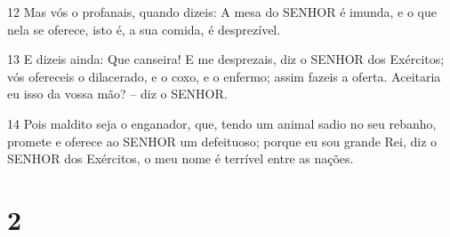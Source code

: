 \par 12 Mas vós o profanais, quando dizeis: A mesa do SENHOR é imunda, e o que nela se oferece, isto é, a sua comida, é desprezível.
\par 13 E dizeis ainda: Que canseira! E me desprezais, diz o SENHOR dos Exércitos; vós ofereceis o dilacerado, e o coxo, e o enfermo; assim fazeis a oferta. Aceitaria eu isso da vossa mão? -- diz o SENHOR.
\par 14 Pois maldito seja o enganador, que, tendo um animal sadio no seu rebanho, promete e oferece ao SENHOR um defeituoso; porque eu sou grande Rei, diz o SENHOR dos Exércitos, o meu nome é terrível entre as nações.

\chapter{2}

